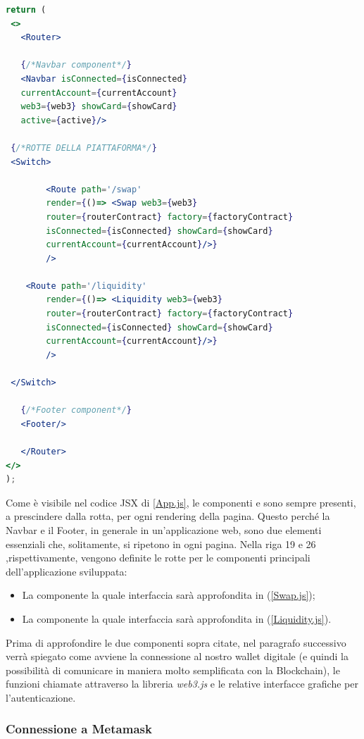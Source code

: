 \begin{lstlisting}[caption={[App.js (exchange)]},language=jsx] 
return (
 <>
   <Router>
   
   {/*Navbar component*/}
   <Navbar isConnected={isConnected}
   currentAccount={currentAccount}
   web3={web3} showCard={showCard} 
   active={active}/>
   
 {/*ROTTE DELLA PIATTAFORMA*/}
 <Switch>
 
		<Route path='/swap'
        render={()=> <Swap web3={web3} 
        router={routerContract} factory={factoryContract}  
        isConnected={isConnected} showCard={showCard}
        currentAccount={currentAccount}/>}
        />

    <Route path='/liquidity'
        render={()=> <Liquidity web3={web3} 
        router={routerContract} factory={factoryContract}  
        isConnected={isConnected} showCard={showCard}
        currentAccount={currentAccount}/>}
        />
         
 </Switch>

   {/*Footer component*/}
   <Footer/>

   </Router>
</>
);																												-App.js
\end{lstlisting}\makeatletter{}\makeatother
\label{App.js}

Come è visibile nel codice JSX di \ref{App.js}, le componenti  e  sono sempre presenti, a prescindere dalla rotta, per ogni rendering della pagina.
Questo perché la Navbar e il Footer, in generale in un'applicazione web, sono due elementi essenziali che, solitamente, si ripetono in ogni pagina.
Nella riga 19 e 26 ,rispettivamente, vengono definite le rotte per le componenti principali dell'applicazione sviluppata:
\begin{itemize}
\item La componente  la quale interfaccia sarà approfondita in (\ref{Swap.js});
\item La componente  la quale interfaccia sarà approfondita in (\ref{Liquidity.js}).
\end{itemize}
Prima di approfondire le due componenti sopra citate, nel paragrafo successivo verrà spiegato come avviene la connessione al nostro wallet digitale (e quindi la possibilità di comunicare in maniera molto semplificata con la Blockchain), le funzioni chiamate attraverso la libreria \textit{web3.js} e le relative interfacce grafiche per l'autenticazione.
\subsubsection{Connessione a Metamask }\makeatletter{}\makeatother
\label{Connessione a Metamask}

